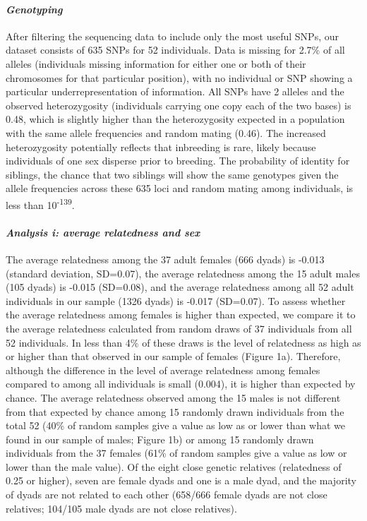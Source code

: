 \documentclass[]{article}
\let\oldparagraph\paragraph
\renewcommand{\paragraph}[1]{\oldparagraph{#1}\mbox{}}
\begin{document}
\hypertarget{genotyping}{%
\paragraph{\texorpdfstring{\emph{Genotyping}}{Genotyping}}\label{genotyping}}

After filtering the sequencing data to include only the most useful
SNPs, our dataset consists of 635 SNPs for 52 individuals. Data is
missing for 2.7\% of all alleles (individuals missing information for
either one or both of their chromosomes for that particular position),
with no individual or SNP showing a particular underrepresentation of
information. All SNPs have 2 alleles and the observed heterozygosity
(individuals carrying one copy each of the two bases) is 0.48, which is
slightly higher than the heterozygosity expected in a population with
the same allele frequencies and random mating (0.46). The increased
heterozygosity potentially reflects that inbreeding is rare, likely
because individuals of one sex disperse prior to breeding. The
probability of identity for siblings, the chance that two siblings will
show the same genotypes given the allele frequencies across these 635
loci and random mating among individuals, is less than
10\textsuperscript{-139}.

\hypertarget{analysis-i-average-relatedness-and-sex-1}{%
\paragraph{\texorpdfstring{\emph{Analysis i: average relatedness and
sex}}{Analysis i: average relatedness and sex}}\label{analysis-i-average-relatedness-and-sex-1}}

The average relatedness among the 37 adult females (666 dyads) is -0.013
(standard deviation, SD=0.07), the average relatedness among the 15
adult males (105 dyads) is -0.015 (SD=0.08), and the average relatedness
among all 52 adult individuals in our sample (1326 dyads) is -0.017
(SD=0.07). To assess whether the average relatedness among females is
higher than expected, we compare it to the average relatedness
calculated from random draws of 37 individuals from all 52 individuals.
In less than 4\% of these draws is the level of relatedness as high as
or higher than that observed in our sample of females (Figure 1a).
Therefore, although the difference in the level of average relatedness
among females compared to among all individuals is small (0.004), it is
higher than expected by chance. The average relatedness observed among
the 15 males is not different from that expected by chance among 15
randomly drawn individuals from the total 52 (40\% of random samples
give a value as low as or lower than what we found in our sample of
males; Figure 1b) or among 15 randomly drawn individuals from the 37
females (61\% of random samples give a value as low or lower than the
male value). Of the eight close genetic relatives (relatedness of 0.25
or higher), seven are female dyads and one is a male dyad, and the
majority of dyads are not related to each other (658/666 female dyads
are not close relatives; 104/105 male dyads are not close relatives).
\end{document}
